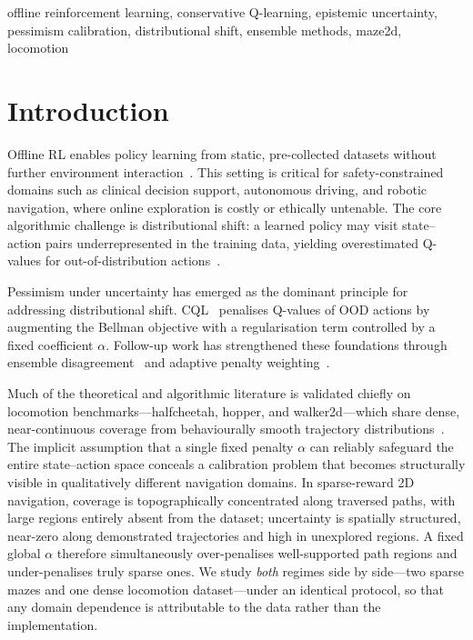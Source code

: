 \documentclass[conference]{IEEEtran}
\begin{document}
\begin{IEEEkeywords}
offline reinforcement learning, conservative Q-learning, epistemic
uncertainty, pessimism calibration, distributional shift, ensemble
methods, maze2d, locomotion
\end{IEEEkeywords}

\section{Introduction}
\label{sec:intro}

Offline RL enables policy learning from static, pre-collected datasets
without further environment interaction~\cite{levine2020offline}. This
setting is critical for safety-constrained domains such as clinical
decision support, autonomous driving, and robotic navigation, where online
exploration is costly or ethically untenable. The core algorithmic challenge
is distributional shift: a learned policy may visit state--action pairs
underrepresented in the training data, yielding overestimated Q-values for
out-of-distribution actions~\cite{fujimoto2019bcq}.

Pessimism under uncertainty has emerged as the dominant principle for
addressing distributional shift. CQL~\cite{kumar2020conservative} penalises
Q-values of OOD actions by augmenting the Bellman objective with a
regularisation term controlled by a fixed coefficient $\alpha$. Follow-up
work has strengthened these foundations through ensemble
disagreement~\cite{an2021pbrl,wu2021uncertainty} and adaptive penalty
weighting~\cite{liu2023aptq}.

Much of the theoretical and algorithmic literature is validated chiefly on
locomotion benchmarks---halfcheetah, hopper, and walker2d---which share
dense, near-continuous coverage from behaviourally smooth trajectory
distributions~\cite{fu2020d4rl}. The implicit assumption that a single fixed
penalty $\alpha$ can reliably safeguard the entire state--action space
conceals a calibration problem that becomes structurally visible in
qualitatively different navigation domains. In sparse-reward 2D navigation,
coverage is topographically concentrated along traversed paths, with large
regions entirely absent from the dataset; uncertainty is spatially
structured, near-zero along demonstrated trajectories and high in unexplored
regions. A fixed global $\alpha$ therefore simultaneously over-penalises
well-supported path regions and under-penalises truly sparse ones. We study
\emph{both} regimes side by side---two sparse mazes and one dense locomotion
dataset---under an identical protocol, so that any domain dependence is
attributable to the data rather than the implementation.
\end{document}
